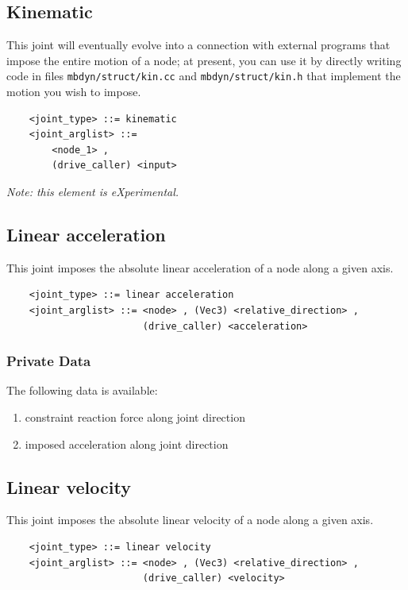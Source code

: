 


\subsection{Kinematic}
This joint will eventually evolve into a connection with external programs
that impose the entire motion of a node; at present, you can use it
by directly writing code in files \verb;mbdyn/struct/kin.cc; and
\verb;mbdyn/struct/kin.h; that implement the motion you wish to impose.
\begin{verbatim}
    <joint_type> ::= kinematic
    <joint_arglist> ::= 
        <node_1> ,
        (drive_caller) <input>
\end{verbatim}
\emph{Note: this element is eXperimental.}

\subsection{Linear acceleration}
This joint imposes the absolute linear acceleration of a node
along a given axis.
\begin{verbatim}
    <joint_type> ::= linear acceleration
    <joint_arglist> ::= <node> , (Vec3) <relative_direction> , 
                        (drive_caller) <acceleration>
\end{verbatim}

\subsubsection{Private Data}
The following data is available:
\begin{enumerate}
\item {} constraint reaction force along joint direction
\item {} imposed acceleration along joint direction
\end{enumerate}

\subsection{Linear velocity}
This joint imposes the absolute linear velocity of a node
along a given axis.
\begin{verbatim}
    <joint_type> ::= linear velocity
    <joint_arglist> ::= <node> , (Vec3) <relative_direction> , 
                        (drive_caller) <velocity>
\end{verbatim}

